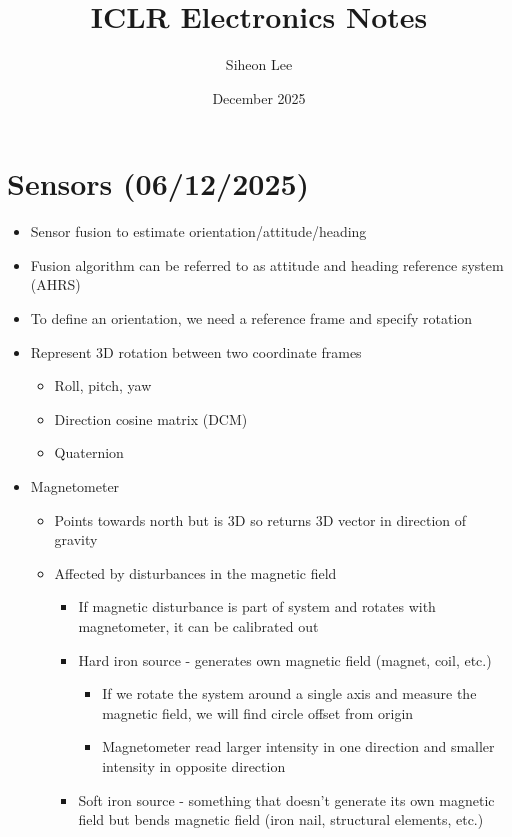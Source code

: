 \documentclass{article}
\title{ICLR Electronics Notes}
\author{Siheon Lee}
\date{December 2025}
\begin{document}
\maketitle

\section{Sensors (06/12/2025)}
\begin{itemize}
    \item Sensor fusion to estimate orientation/attitude/heading
    \item Fusion algorithm can be referred to as attitude and heading reference system (AHRS)
    \item To define an orientation, we need a reference frame and specify rotation
    \item Represent 3D rotation between two coordinate frames
    \begin{itemize}
        \item Roll, pitch, yaw
        \item Direction cosine matrix (DCM)
        \item Quaternion
    \end{itemize}
    \item Magnetometer
    \begin{itemize}
        \item Points towards north but is 3D so returns 3D vector in direction of gravity
        \item Affected by disturbances in the magnetic field
        \begin{itemize}
            \item If magnetic disturbance is part of system and rotates with magnetometer, it can be calibrated out
            \item Hard iron source - generates own magnetic field (magnet, coil, etc.)
            \begin{itemize}
                \item If we rotate the system around a single axis and measure the magnetic field, we will find circle offset from origin
                \item Magnetometer read larger intensity in one direction and smaller intensity in opposite direction
            \end{itemize}
            \item Soft iron source - something that doesn't generate its own magnetic field but bends magnetic field (iron nail, structural elements, etc.)

\end{itemize}
\end{itemize}
\end{itemize}
\end{document}
